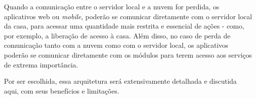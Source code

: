 Quando a comunicação entre o servidor local e a nuvem for perdida, os aplicativos web ou \textit{mobile}, poderão se comunicar diretamente com o servidor local da casa, para acessar uma quantidade mais restrita e essencial de ações - como, por exemplo, a liberação de acesso à casa. Além disso, no caso de perda de comunicação tanto com a nuvem como com o servidor local, os aplicativos poderão se comunicar diretamente com os módulos para terem acesso aos serviços de extrema importância.

Por ser escolhida, essa arquitetura será extensivamente detalhada e discutida aqui, com seus benefícios e limitações.
